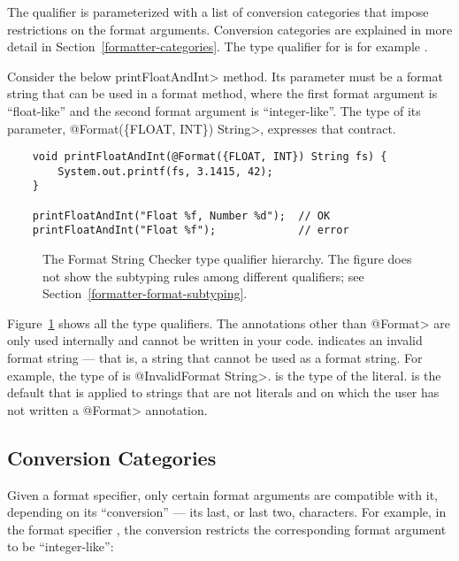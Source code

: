 The  qualifier is parameterized with
a list of conversion categories that impose restrictions on the format arguments.
Conversion categories are explained in more detail in
Section~\ref{formatter-categories}.  The type qualifier for  is
for example .

Consider the below \<printFloatAndInt> method.  Its parameter must be a
format string that can be used in a format method, where the first format
argument is ``float-like'' and the second format argument is
``integer-like''.  The type of its parameter, \<@Format(\{FLOAT, INT\})
String>, expresses that contract.

\begin{Verbatim}
    void printFloatAndInt(@Format({FLOAT, INT}) String fs) {
        System.out.printf(fs, 3.1415, 42);
    }

    printFloatAndInt("Float %f, Number %d");  // OK
    printFloatAndInt("Float %f");             // error
\end{Verbatim}

\begin{figure}
\caption{The
  Format String Checker type qualifier hierarchy.
  The figure does not show the subtyping rules among different
  qualifiers; see
  Section~\ref{formatter-format-subtyping}.
}
\label{fig-formatter-hierarchy}
\end{figure}

Figure~\ref{fig-formatter-hierarchy} shows all the type qualifiers.
The annotations other than \<@Format> are only used
internally and cannot be written in your code.
 indicates an invalid format
string --- that is, a string that cannot be used as a format string.  For
example, the type of  is \<@InvalidFormat String>.
 is the type of the
 literal.
 is the default that is
applied to strings that are not literals and on which the user has not
written a \<@Format> annotation.

\subsection{Conversion Categories\label{formatter-categories}}

Given a format specifier, only certain format arguments are compatible with
it, depending on its ``conversion'' --- its last, or last two,
characters.  For example, in the format specifier , the
conversion  restricts the corresponding format argument
to be ``integer-like'':

